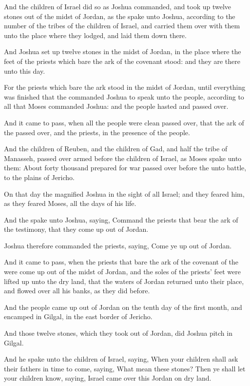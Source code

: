 \verse And the children of Israel did so as Joshua commanded, and took up twelve stones out of the midst of Jordan, as the \LORD spake unto Joshua, according to the number of the tribes of the children of Israel, and carried them over with them unto the place where they lodged, and laid them down there.

\verse And Joshua set up twelve stones in the midst of Jordan, in the place where the feet of the priests which bare the ark of the covenant stood: and they are there unto this day.

\verse For the priests which bare the ark stood in the midst of Jordan, until everything was finished that the \LORD commanded Joshua to speak unto the people, according to all that Moses commanded Joshua: and the people hasted and passed over.

\verse And it came to pass, when all the people were clean passed over, that the ark of the \LORD passed over, and the priests, in the presence of the people.

\verse And the children of Reuben, and the children of Gad, and half the tribe of Manasseh, passed over armed before the children of Israel, as Moses spake unto them: \verse About forty thousand prepared for war passed over before the \LORD unto battle, to the plains of Jericho.

\verse On that day the \LORD magnified Joshua in the sight of all Israel; and they feared him, as they feared Moses, all the days of his life.

\verse And the \LORD spake unto Joshua, saying, \verse Command the priests that bear the ark of the testimony, that they come up out of Jordan.

\verse Joshua therefore commanded the priests, saying, Come ye up out of Jordan.

\verse And it came to pass, when the priests that bare the ark of the covenant of the \LORD were come up out of the midst of Jordan, and the soles of the priests' feet were lifted up unto the dry land, that the waters of Jordan returned unto their place, and flowed over all his banks, as they did before.

\verse And the people came up out of Jordan on the tenth day of the first month, and encamped in Gilgal, in the east border of Jericho.

\verse And those twelve stones, which they took out of Jordan, did Joshua pitch in Gilgal.

\verse And he spake unto the children of Israel, saying, When your children shall ask their fathers in time to come, saying, What mean these stones?  \verse Then ye shall let your children know, saying, Israel came over this Jordan on dry land.

